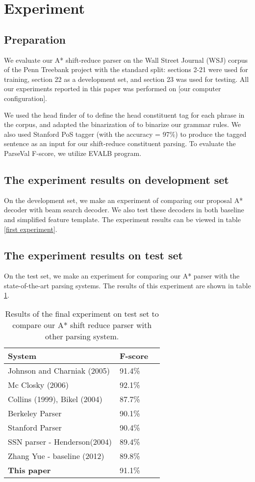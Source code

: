 \section{Experiment}
\subsection{Preparation}
We evaluate our A* shift-reduce parser on the Wall Street Journal (WSJ) corpus of the Penn Treebank project with the standard split: sections 2-21 were used for training, section 22 as a development set, and section 23 was used for testing. All our experiments reported in this paper was performed on [our computer configuration].

We used the head finder of \cite{1999Collins} to define the head constituent tag for each phrase in the corpus, and adapted the binarization of \cite{2009Zhang} to binarize our grammar rules. We also used Stanford PoS tagger (with the accuracy = 97\%) to produce the tagged sentence as an input for our shift-reduce constituent parsing. To evaluate the ParseVal F-score, we utilize EVALB program.

\subsection{The experiment results on development set}
On the development set, we make an experiment of comparing our proposal A* decoder with beam search decoder. We also test these decoders in both baseline and simplified feature template. The experiment results can be viewed in table \ref{first experiment}.

\subsection{The experiment results on test set}
On the test set, we make an experiment for comparing our A* parser with the state-of-the-art parsing systems. The results of this experiment are shown in table \ref{second experiment}.
\begin{table}
	\begin{center}
		\caption{\label{second experiment} Results of the final experiment on test set to compare our A* shift reduce parser with other parsing system.}
		\begin{tabular}{|l|l|l|}
			\hline \bf System & \bf F-score \\ \hline
			Johnson and Charniak (2005) & 91.4\% \\
			Mc Closky (2006) & 92.1\%\\
			Collins (1999), Bikel (2004) & 87.7\% \\
			Berkeley Parser & 90.1\%  \\
			Stanford Parser &  90.4\% \\
			SSN parser - Henderson(2004) & 89.4\%  \\
			Zhang Yue - baseline (2012) & 89.8\% \\
			\textbf{This paper} & 91.1\% \\
			\hline
		\end{tabular}
	\end{center}
\end{table}

